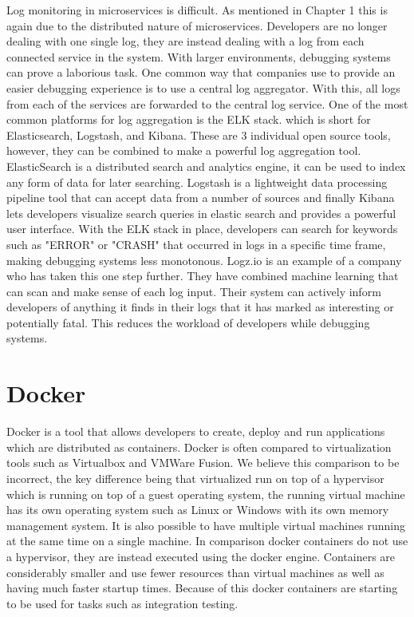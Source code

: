 Log monitoring in microservices is difficult. As mentioned in Chapter 1 this is again due to the distributed nature of microservices. Developers are no longer dealing with one single log, they are instead dealing with a log from each connected service in the system. With larger environments, debugging systems can prove a laborious task. One common way that companies use to provide an easier debugging experience is to use a central log aggregator. With this, all logs from each of the services are forwarded to the central log service. One of the most common platforms for log aggregation is the ELK stack. which is short for Elasticsearch, Logstash, and Kibana. These are 3 individual open source tools, however, they can be combined to make a powerful log aggregation tool. ElasticSearch is a distributed search and analytics engine, it can be used to index any form of data for later searching. Logstash is a lightweight data processing pipeline tool that can accept data from a number of sources and finally Kibana lets developers visualize search queries in elastic search and provides a powerful user interface. With the ELK stack in place, developers can search for keywords such as "ERROR" or "CRASH" that occurred in logs in a specific time frame, making debugging systems less monotonous. Logz.io is an example of a company who has taken this one step further. They have combined machine learning that can scan and make sense of each log input. Their system can actively inform developers of anything it finds in their logs that it has marked as interesting or potentially fatal. This reduces the workload of developers while debugging systems.

\section{Docker}

Docker is a tool that allows developers to create, deploy and run applications which are distributed as containers. Docker is often compared to virtualization tools such as Virtualbox and VMWare Fusion. We believe this comparison to be incorrect, the key difference being that virtualized run on top of a hypervisor which is running on top of a guest operating system, the running virtual machine has its own operating system such as Linux or Windows with its own memory management system. It is also possible to have multiple virtual machines running at the same time on a single machine. In comparison docker containers do not use a hypervisor, they are instead executed using the docker engine. Containers are considerably smaller and use fewer resources than virtual machines as well as having much faster startup times. Because of this docker containers are starting to be used for tasks such as integration testing.

